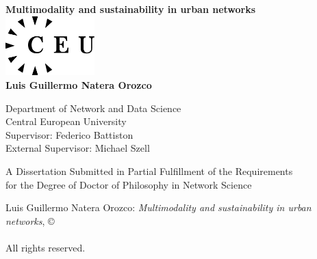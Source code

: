 \documentclass[a4paper,twoside,12pt]{book}
\begin{document}
\begin{titlepage}
	\begin{center}

		\textbf{\LARGE{Multimodality and sustainability in urban networks}}\\[3.3cm] %

		\includegraphics[width=3.45cm,height=2.3cm]{images/ceulogo.eps}\\[3.4cm]
		{\Large{\textbf{Luis Guillermo Natera Orozco}}}\\[0.4cm]

		\medskip

		Department of Network and Data Science \\
		Central European University\\ [1.2cm]

		Supervisor: Federico Battiston \\
		External Supervisor: Michael Szell

		\vfill

		A Dissertation Submitted in Partial Fulfillment of the Requirements\\ for the Degree of Doctor of Philosophy in Network Science\\[2cm]


		\vspace{1.0cm}
		\the\year
	\end{center}
\end{titlepage}

\newpage

\pagestyle{empty}

\mbox{}

\vfill

\noindent Luis Guillermo Natera Orozco: \emph{Multimodality and sustainability in urban networks}, \copyright \\
\the\year \\ All rights reserved.



\mbox{}

\pagestyle{empty}
\end{document}
